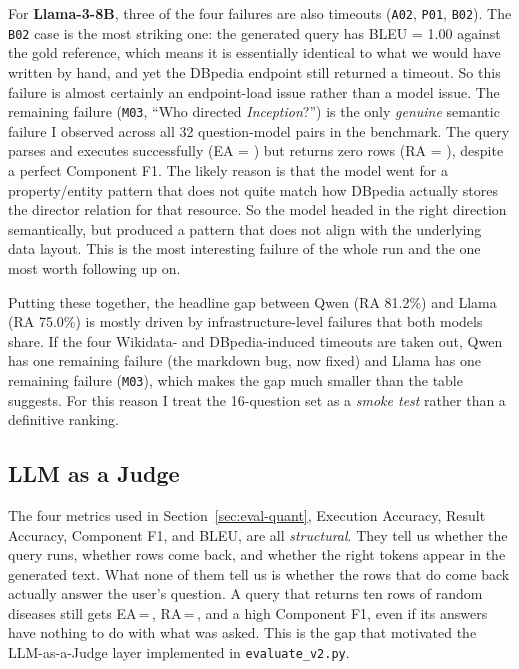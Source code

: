 \documentclass[11pt,a4paper]{article}
\newcommand{\cmark}{\ding{51}}%
\newcommand{\xmark}{\ding{55}}%
\begin{document}
For \textbf{Llama-3-8B}, three of the four failures are also
timeouts (\texttt{A02}, \texttt{P01}, \texttt{B02}). The \texttt{B02}
case is the most striking one: the generated query has BLEU = 1.00
against the gold reference, which means it is essentially identical
to what we would have written by hand, and yet the DBpedia endpoint
still returned a timeout. So this failure is almost certainly an
endpoint-load issue rather than a model issue. The remaining failure
(\texttt{M03}, ``Who directed \emph{Inception}?'') is the only
\emph{genuine} semantic failure I observed across all 32
question-model pairs in the benchmark. The query parses and executes
successfully (EA = \cmark) but returns zero rows (RA = \xmark),
despite a perfect Component F1. The likely reason is that the model
went for a property/entity pattern that does not quite match how
DBpedia actually stores the director relation for that resource. So
the model headed in the right direction semantically, but produced a
pattern that does not align with the underlying data layout. This is
the most interesting failure of the whole run and the one most worth
following up on.

Putting these together, the headline gap between Qwen (RA 81.2\%) and
Llama (RA 75.0\%) is mostly driven by infrastructure-level failures
that both models share. If the four Wikidata- and DBpedia-induced
timeouts are taken out, Qwen has one remaining failure (the markdown
bug, now fixed) and Llama has one remaining failure (\texttt{M03}),
which makes the gap much smaller than the table suggests. For this
reason I treat the 16-question set as a \emph{smoke test} rather
than a definitive ranking.

\subsection{LLM as a Judge}
\label{sec:llm-judge}

The four metrics used in Section~\ref{sec:eval-quant}, Execution
Accuracy, Result Accuracy, Component F1, and BLEU, are all
\emph{structural}. They tell us whether the query runs, whether rows
come back, and whether the right tokens appear in the generated text.
What none of them tell us is whether the rows that do come back
actually answer the user's question. A query that returns ten rows of
random diseases still gets EA\,=\,\cmark, RA\,=\,\cmark, and a high
Component F1, even if its answers have nothing to do with what was
asked. This is the gap that motivated the LLM-as-a-Judge layer
\cite{zheng2023judging} implemented in \texttt{evaluate\_v2.py}.
\end{document}
